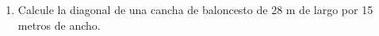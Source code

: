 \documentclass[fleqn]{article}
\begin{document}
\begin{enumerate}
\begin{enumerate}
 \end{enumerate}
 \item Calcule la diagonal de una cancha de baloncesto de 28 m de largo por 15 metros de ancho.\noanswer

 \end{enumerate}
\end{document}
